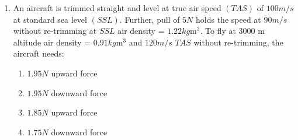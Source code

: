 \documentclass[journal]{IEEEtran}
\newcommand{\brak}[1]{\left( #1 \right)}
\begin{document}
\begin{enumerate}
    \item An aircraft is trimmed straight and level at true air speed $\brak{TAS}$ of $100 m/s$ at standard sea level $\brak{SSL}$. Further, pull of $5 N$ holds the speed at $90 m/s$ without re-trimming at $SSL$ air density = $1.22 kg \text{m}^3$. To fly at 3000 m altitude air density = $0.91 kg \text{m}^3$ and $120 m/s$ $TAS$ without re-trimming, the aircraft needs:
    \begin{enumerate}
        \item $1.95 N$ upward force
        \item $1.95 N$ downward force
        \item $1.85 N$ upward force
        \item $1.75 N$ downward force
    \end{enumerate}
    
   



\end{enumerate}
\end{document}
